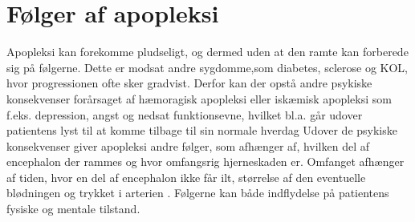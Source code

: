 \section{Følger af apopleksi }
Apopleksi kan forekomme pludseligt, og dermed uden at den ramte kan forberede sig på følgerne. Dette er modsat andre sygdomme,som diabetes, sclerose og KOL, hvor progressionen ofte sker gradvist. Derfor kan der opstå andre psykiske konsekvenser forårsaget af hæmoragisk apopleksi eller iskæmisk apopleksi som f.eks. depression, angst og nedsat funktionsevne, hvilket bl.a. går udover patientens lyst til at komme tilbage til sin normale hverdag \cite{Muus2008} Udover de psykiske konsekvenser giver apopleksi andre følger, som afhænger af, hvilken del af encephalon der rammes og hvor omfangsrig hjerneskaden er. Omfanget afhænger af tiden, hvor en del af encephalon ikke får ilt, størrelse af den eventuelle blødningen og trykket i arterien \cite{Michael-Titus2010}. Følgerne kan både indflydelse på patientens fysiske og mentale tilstand. \\


